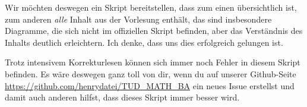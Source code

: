 Wir möchten deswegen ein Skript bereitstellen, dass zum einen übersichtlich ist, zum anderen \textit{alle} Inhalt aus der Vorlesung enthält, das sind insbesondere Diagramme, die sich nicht im offiziellen Skript befinden, aber das Verständnis des Inhalts deutlich erleichtern. Ich denke, dass uns dies erfolgreich gelungen ist.

Trotz intensivem Korrekturlesen können sich immer noch Fehler in diesem Skript befinden. Es wäre deswegen ganz toll von dir, wenn du auf unserer Github-Seite \url{https://github.com/henrydatei/TUD_MATH_BA} ein neues Issue erstellst und damit auch anderen hilfst, dass dieses Skript immer besser wird.